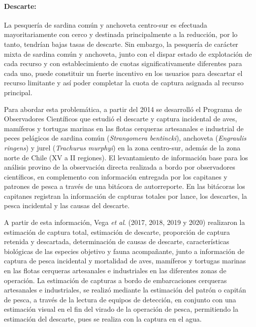 \documentclass[
  spanish,
]{article}
\begin{document}
\hypertarget{descarte}{%
\paragraph{Descarte:}\label{descarte}}

La pesquería de sardina común y anchoveta centro-sur es efectuada
mayoritariamente con cerco y destinada principalmente a la reducción,
por lo tanto, tendrían bajas tasas de descarte. Sin embargo, la
pesquería de carácter mixta de sardina común y anchoveta, junto con el
dispar estado de explotación de cada recurso y con establecimiento de
cuotas significativamente diferentes para cada uno, puede constituir un
fuerte incentivo en los usuarios para descartar el recurso limitante y
así poder completar la cuota de captura asignada al recurso principal.

Para abordar esta problemática, a partir del 2014 se desarrolló el
Programa de Observadores Científicos que estudió el descarte y captura
incidental de aves, mamíferos y tortugas marinas en las flotas cerqueras
artesanales e industrial de peces pelágicos de sardina común
(\emph{Strangomera bentincki}), anchoveta (\emph{Engraulis ringens}) y
jurel (\emph{Trachurus murphyi}) en la zona centro-sur, además de la
zona norte de Chile (XV a II regiones). El levantamiento de información
base para los análisis provino de la observación directa realizada a
bordo por observadores científicos, en complemento con información
entregada por los capitanes y patrones de pesca a través de una bitácora
de autorreporte. En las bitácoras los capitanes registran la información
de capturas totales por lance, los descartes, la pesca incidental y las
causas del descarte.

A partir de esta información, Vega \emph{et al}. (2017, 2018, 2019 y
2020) realizaron la estimación de captura total, estimación de descarte,
proporción de captura retenida y descartada, determinación de causas de
descarte, características biológicas de las especies objetivo y fauna
acompañante, junto a información de captura de pesca incidental y
mortalidad de aves, mamíferos y tortugas marinas en las flotas cerqueras
artesanales e industriales en las diferentes zonas de operación. La
estimación de capturas a bordo de embarcaciones cerqueras artesanales e
industriales, se realizó mediante la estimación del patrón o capitán de
pesca, a través de la lectura de equipos de detección, en conjunto con
una estimación visual en el fin del virado de la operación de pesca,
permitiendo la estimación del descarte, pues se realiza con la captura
en el agua.
\end{document}
